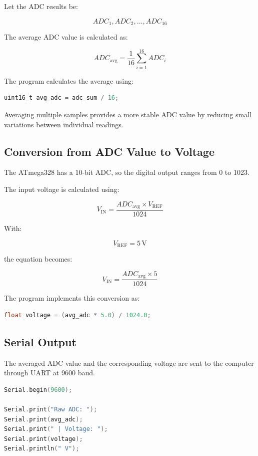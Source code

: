 \documentclass[12pt,a4paper]{article}
\begin{document}
Let the ADC results be:

\[
ADC_1, ADC_2, \ldots, ADC_{16}
\]

The average ADC value is calculated as:

\[
ADC_{\mathrm{avg}}
=
\frac{1}{16}
\sum_{i=1}^{16} ADC_i
\]

The program calculates the average using:

\begin{lstlisting}[language=C]
uint16_t avg_adc = adc_sum / 16;
\end{lstlisting}

Averaging multiple samples provides a more stable ADC value by reducing small variations between individual readings.

\subsection{Conversion from ADC Value to Voltage}

The ATmega328 has a 10-bit ADC, so the digital output ranges from 0 to 1023.

The input voltage is calculated using:

\[
V_{\mathrm{IN}}
=
\frac{ADC_{\mathrm{avg}} \times V_{\mathrm{REF}}}{1024}
\]

With:

\[
V_{\mathrm{REF}} = 5\,\mathrm{V}
\]

the equation becomes:

\[
V_{\mathrm{IN}}
=
\frac{ADC_{\mathrm{avg}} \times 5}{1024}
\]

The program implements this conversion as:

\begin{lstlisting}[language=C]
float voltage = (avg_adc * 5.0) / 1024.0;
\end{lstlisting}

\subsection{Serial Output}

The averaged ADC value and the corresponding voltage are sent to the computer through UART at 9600 baud.

\begin{lstlisting}[language=C]
Serial.begin(9600);

Serial.print("Raw ADC: ");
Serial.print(avg_adc);
Serial.print(" | Voltage: ");
Serial.print(voltage);
Serial.println(" V");
\end{lstlisting}
\end{document}
